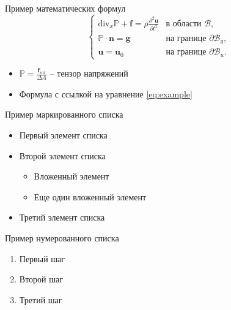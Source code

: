 \documentclass[10pt]{beamer}  %
\newcommand{\bP}{\mathbb{P}}
\begin{document}
\begin{frame}{Пример математических формул}
    \begin{equation}
        \label{eq:example}
        \begin{cases}
             \text{div}_x \bP + \boldsymbol{f} = \rho \frac{\partial^2 \boldsymbol{u}}{\partial t^2}  & \text{в области } \mathcal{B}, \\
            \bP \cdot \boldsymbol{n} = \boldsymbol{g} & \text{на границе } \partial \mathcal{B}_g, \\
            \boldsymbol{u} = \boldsymbol{u}_0 & \text{на границе } \partial \mathcal{B}_u.
        \end{cases}
    \end{equation}
    
    \begin{itemize}
        \item $\displaystyle \bP = \frac{\boldsymbol{f}_{int}}{\Delta A}$ -- тензор напряжений
        \item Формула с ссылкой на уравнение \eqref{eq:example}
    \end{itemize}
\end{frame}

\begin{frame}{Пример маркированного списка}
    \begin{itemize}
        \item Первый элемент списка
        \item Второй элемент списка
            \begin{itemize}
                \item Вложенный элемент
                \item Еще один вложенный элемент
            \end{itemize}
        \item Третий элемент списка
    \end{itemize}
\end{frame}

\begin{frame}{Пример нумерованного списка}
    \begin{enumerate}
        \item Первый шаг
        \item Второй шаг
        \item Третий шаг
    \end{enumerate}
\end{frame}
\end{document}
